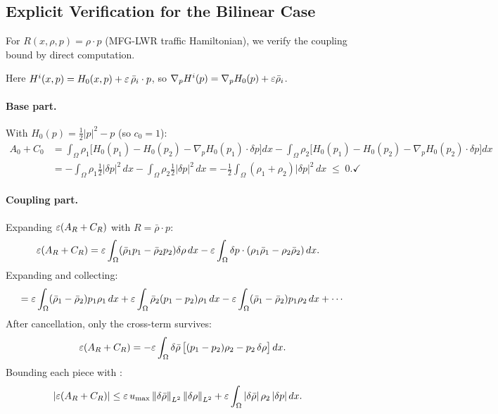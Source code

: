 \subsection{Explicit Verification for the Bilinear Case}
\label{app:bilinear}

For $R(x,\rho,p) = \rho\cdot p$ (MFG-LWR traffic Hamiltonian), we verify
the coupling bound by direct computation.

Here $H^i(x,p) = H_0(x,p) + \varepsilon\,\bar\rho_i\cdot p$, so
$\nabla_p H^i(p) = \nabla_pH_0(p) + \varepsilon\bar\rho_i$.

\paragraph{Base part.} With $H_0(p) = \frac{1}{2}|p|^2 - p$ (so $c_0=1$):
\begin{align*}
  A_0 + C_0
  &= \int_\Omega\rho_1\bigl[H_0(p_1) - H_0(p_2)
      - \nabla_pH_0(p_1)\cdot\delta p\bigr]dx
    -\int_\Omega\rho_2\bigl[H_0(p_1) - H_0(p_2)
      - \nabla_pH_0(p_2)\cdot\delta p\bigr]dx\\
  &= -\int_\Omega\rho_1\tfrac{1}{2}|\delta p|^2\,dx
     -\int_\Omega\rho_2\tfrac{1}{2}|\delta p|^2\,dx
   = -\frac{1}{2}\int_\Omega(\rho_1+\rho_2)|\delta p|^2\,dx \;\leq\; 0. \checkmark
\end{align*}

\paragraph{Coupling part.} Expanding $\varepsilon(A_R+C_R)$ with $R=\bar\rho\cdot p$:
\begin{align*}
  \varepsilon(A_R+C_R)
  &= \varepsilon\int_\Omega(\bar\rho_1 p_1 - \bar\rho_2 p_2)\delta\rho\,dx
   - \varepsilon\int_\Omega\delta p\cdot(\rho_1\bar\rho_1 - \rho_2\bar\rho_2)\,dx.
\end{align*}
Expanding and collecting:
\[
  = \varepsilon\int_\Omega(\bar\rho_1-\bar\rho_2)p_1\rho_1\,dx
   +\varepsilon\int_\Omega\bar\rho_2(p_1-p_2)\rho_1\,dx
   -\varepsilon\int_\Omega(\bar\rho_1-\bar\rho_2)p_1\rho_2\,dx
   +\cdots
\]
After cancellation, only the cross-term survives:
\[
  \varepsilon(A_R+C_R) = -\varepsilon\int_\Omega\delta\bar\rho\,
  \bigl[(p_1-p_2)\rho_2 - p_2\,\delta\rho\bigr]\,dx.
\]
Bounding each piece with :
\begin{align*}
  |\varepsilon(A_R+C_R)|
  &\leq \varepsilon\,u_{\max}\left\lVert \delta\bar\rho \right\rVert_{L^2}\left\lVert \delta\rho \right\rVert_{L^2}
   + \varepsilon\int_\Omega |\delta\bar\rho|\,\rho_2\,|\delta p|\,dx.
\end{align*}

